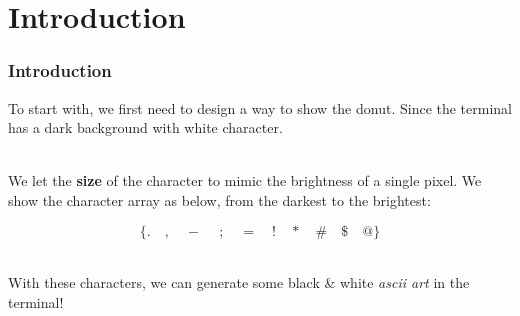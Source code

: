 \documentclass[12pt, t]{beamer}
\renewcommand{\emph}[1]{{\color{Turquoise3}\textsl{#1}}}
\newcommand{\nullspace}{~\\[15pt]}
\begin{document}

\section{Introduction}
\begin{frame}
    \frametitle{Introduction}

    To start with, we first need to design a way to show the donut. Since the terminal has a dark
    background with white character.

    \nullspace
    We let the \textbf{size} of the character to mimic the brightness of a single pixel. We show
    the character array as below, from the darkest to the brightest:

    \begin{equation*}
        \{.\quad ,\quad -~\quad ;\quad =\quad !\quad *\quad \#\quad \$\quad @\}
    \end{equation*}

    \nullspace
    With these characters, we can generate some black \& white \emph{ascii art} in the terminal!

\end{frame}

\end{document}
